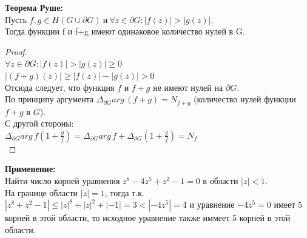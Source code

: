 \textbf{Теорема Руше:}\\
Пусть $f,g \in H(G \cup \partial G) \ \textrm{и} \ \forall z \in \partial G: |f(z)| > |g(z)|$. \\
Тогда функции f и f+g имеют одинаковое количество нулей в G.\\[2mm]

\begin{proof}
    \ \\
    $\forall z \in \partial G: |f(z)|>|g(z)|\geq 0$\\
    $|(f+g)(z)| \geq |f(z)| - |g(z)| > 0$\\
    Отсюда следует, что функция $f$ и $f+g$ не имеют нулей на $\partial G$.\\
    По принципу аргумента $\Delta_{\partial G}arg\, (f+g) = N_{f+g}$ (количество нулей функции $f+g$ в $G$).\\
    С другой стороны:\\
    $\Delta_{\partial G} arg\, f(1+\frac{g}{f})=\Delta_{\partial G} arg\, f+\Delta_{\partial G}(1+\frac{g}{f})=N_f$\\
    
\end{proof}
\textbf{Применение:}\\
Найти число корней уравнения $z^8-4z^5+z^2-1=0$ в области $|z|<1$.\\
На границе области $|z|=1$, тогда т.к. $|z^8+z^2-1|\leq |z|^8+|z|^2+|-1|=3 < |-4z^5|=4$ и уравнение $-4z^5=0$ имеет 5 корней в этой области, то исходное уравнение также иммеет 5 корней в этой области.
